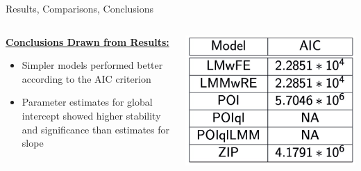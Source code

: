 \documentclass[11pt]{beamer}
\begin{document}
\begin{frame}{Results, Comparisons, Conclusions}

\begin{columns}

\begin{column}{0.5\textwidth}
\underline{\textbf{Conclusions Drawn from Results:}}
\begin{itemize}
	\item Simpler models performed better according to the AIC criterion\\[1em]
	\item Parameter estimates for global intercept showed higher stability and significance than estimates for  slope
\end{itemize}
\end{column}

\begin{column}{0.5\textwidth}
\centering
\includegraphics[width=\textwidth]{2019-11-25_03-05-00.jpeg}
\end{column}
\end{columns}
\end{frame}
\end{document}
